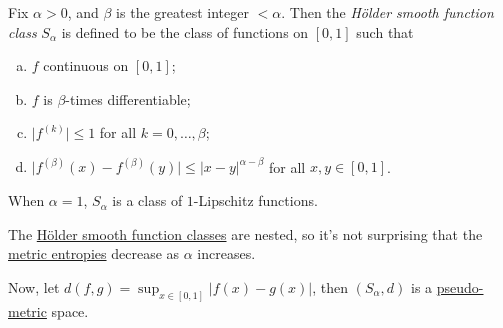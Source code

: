 \begin{definition}\label{def:Holder-smooth-function-class}
  Fix \(\alpha > 0\), and \(\beta \) is the greatest integer \(< \alpha \). Then the \emph{Hölder smooth function class} \(S_\alpha \) is defined to be the class of functions on \([0, 1]\) such that
  \begin{enumerate}[(a)]
    \item \(f\) continuous on \([0, 1]\);
    \item \(f\) is \(\beta \)-times differentiable;
    \item \(\vert f^{(k)} \vert \leq 1\) for all \(k = 0, \dots , \beta \);
    \item \(\vert f^{(\beta )}(x) - f^{(\beta )}(y) \vert \leq \vert x - y \vert ^{\alpha - \beta }\) for all \(x, y \in [0, 1]\).
  \end{enumerate}
\end{definition}

\begin{note}
  When \(\alpha = 1\), \(S_\alpha \) is a class of \(1\)-Lipschitz functions.
\end{note}

\begin{remark}
  The \hyperref[def:Holder-smooth-function-class]{Hölder smooth function classes} are nested, so it's not surprising that the \hyperref[def:metric-entropy]{metric entropies} decrease as \(\alpha \) increases.
\end{remark}

Now, let \(d(f, g) = \sup _{x\in [0, 1]} \vert f(x) - g(x) \vert \), then \((S_\alpha , d)\) is a \hyperref[def:pseudo-metric]{pseudo-metric} space.

